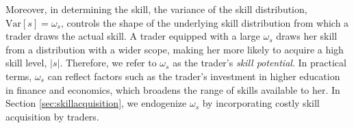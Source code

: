 Moreover, in determining the skill, the variance of the skill distribution, $\mathrm{Var}[s] = \omega_{s}$, controls the shape of the underlying skill distribution from which a trader draws the actual skill. A trader equipped with a large $\omega_{s}$ draws her skill from a distribution with a wider scope, making her more likely to acquire a high skill level, $|s|$. Therefore, we refer to $\omega_{s}$ as the trader's \textit{skill potential}. In practical terms, $\omega_{s}$ can reflect factors such as the trader’s investment in higher education in finance and economics, which broadens the range of skills available to her. In Section \ref{sec:skillacquisition}, we endogenize $\omega_{s}$ by incorporating costly skill acquisition by traders.